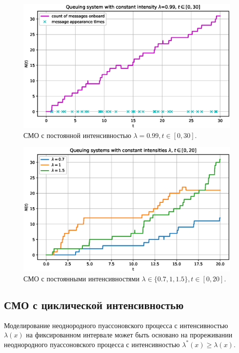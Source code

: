 \documentclass[11pt]{report}
\begin{document}
\begin{figure}[H]
    \centering
    \includegraphics[width=0.85\linewidth]{images/qs-constant.eps}
    \caption{СМО с постоянной интенсивностью $\lambda=0.99,t\in[0,30]$.}
    \label{fig:qs-constant}
\end{figure}

\begin{figure}[H]
    \centering
    \includegraphics[width=0.85\linewidth]{images/qs-multiple-constant.eps}
    \caption{СМО с постоянными интенсивностями $\lambda\in\{0.7,1,1.5\},t\in[0,20]$.}
    \label{fig:qs-multiple-constant}
\end{figure}

\subsection{СМО с циклической интенсивностью}

Моделирование неоднородного пуассоновского процесса с интенсивностью $\lambda(x)$ на фиксированном интервале может быть основано на прореживании неоднородного пуассоновского процесса с интенсивностью $\lambda^*(x)\geqslant\lambda(x)$.
\end{document}
